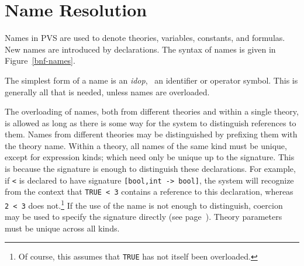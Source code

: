 
\chapter{Name Resolution}\label{names}\label{resolution}

Names in PVS are used to denote theories, variables, constants, and
formulas.  New names are introduced by declarations.  The syntax of names
is given in Figure~\ref{bnf-names}.


The simplest form of a name is an \emph{idop}, \ie\ an identifier or
operator symbol.  This is generally all that is needed, unless names are
overloaded.

The overloading of names, both from different theories and within a single
theory, is allowed as long as there is some way for the system to
distinguish references to them.  Names from different theories may be
distinguished by prefixing them with the theory name.  Within a theory,
all names of the same kind must be unique, except for expression kinds;
which need only be unique up to the signature.  This is because the
signature is enough to distinguish these declarations.  For example, if
\texttt{<} is declared to have signature \texttt{[bool,int -> bool]}, the
system will recognize from the context that \texttt{TRUE < 3} contains a
reference to this declaration, whereas \texttt{2 < 3} does
not.\footnote{Of course, this assumes that \texttt{TRUE} has not itself
been overloaded.}  If the use of the name is not enough to distinguish,
coercion may be used to specify the signature directly (see
page~\pageref{coercions}).  Theory parameters must be unique across all
kinds.

